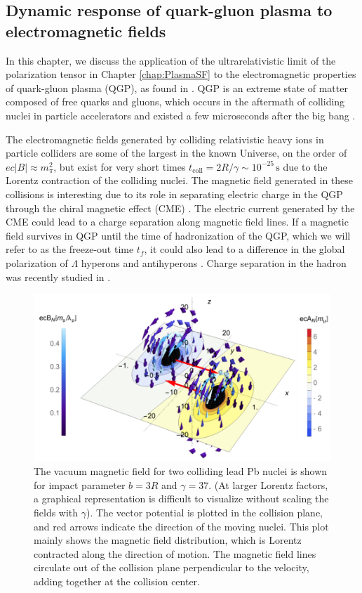 \subsection{Dynamic response of quark-gluon plasma to electromagnetic fields}\label{chap:QCD}

In this chapter, we discuss the application of the ultrarelativistic limit of the polarization tensor in Chapter \ref{chap:PlasmaSF} to the electromagnetic properties of quark-gluon plasma (QGP), as found in \cite{Grayson:2022asf}. QGP is an extreme state of matter composed of free quarks and gluons, which occurs in the aftermath of colliding nuclei in particle accelerators and existed a few microseconds after the big bang \cite{Letessier:2002ony}. 

The electromagnetic fields generated by colliding relativistic heavy ions in particle colliders are some of the largest in the known Universe, on the order of $ec|B| \approx m_\pi^2$, but exist for very short times $t_{\text{coll}}= 2 R/\gamma \sim 10^{-25}\,\textrm{s}$ due to the Lorentz contraction of the colliding nuclei. The magnetic field generated in these collisions is interesting due to its role in separating electric charge in the QGP through the chiral magnetic effect (CME) \cite{Kharzeev:2007jp}. The electric current generated by the CME could lead to a charge separation along magnetic field lines. If a magnetic field survives in QGP until the time of hadronization of the QGP, which we will refer to as the freeze-out time $t_f$, it could also lead to a difference in the global polarization of $\Lambda$ hyperons and antihyperons \cite{Muller:2018ibh}. Charge separation in the hadron was recently studied in \cite{STAR:2023jdd}. 

\begin{figure}[ht]
    \centering
    \includegraphics[width=0.85\linewidth]{plots/chap02QCD/Bfield.png}
    \caption{The vacuum magnetic field for two colliding lead Pb nuclei is shown for impact parameter $b=3R$ and $\gamma =37$. (At larger Lorentz factors, a graphical representation is difficult to visualize without scaling the fields with $\gamma$). The vector potential is plotted in the collision plane, and red arrows indicate the direction of the moving nuclei. This plot mainly shows the magnetic field distribution, which is Lorentz contracted along the direction of motion. The magnetic field lines circulate out of the collision plane perpendicular to the velocity, adding together at the collision center.  }
    \label{fig:vacmag}
\end{figure}

